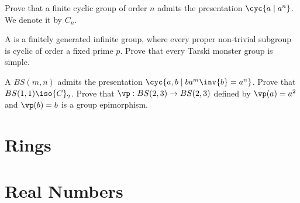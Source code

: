 \documentclass[10pt]{article}
\begin{document}
\begin{problem}
    Prove that a finite cyclic group of order $n$ admits the presentation $\cyc{a\mid{a}^{n}}$. We denote it by ${C}_{n}$.
\end{problem}
\begin{problem}
    A  is a finitely generated infinite group, where every proper non-trivial subgroup is cyclic of order a fixed prime $p$. Prove that every Tarski monster group is simple.
\end{problem}
\begin{problem}
    A  $BS(m,n)$ admits the presentation $\cyc{a,b\mid b{a}^{m}\inv{b}={a}^{n}}$. Prove that $BS(1,1)\iso{C}_{2}$. Prove that $\vp:BS(2,3)\to BS(2,3)$ defined by $\vp(a)={a}^{2}$ and $\vp(b)=b$ is a group epimorphism.
\end{problem}
\begin{definition}
    
\end{definition}


\newpage
\section{Rings}
\newpage
\section{Real Numbers}
\newpage
\end{document}

